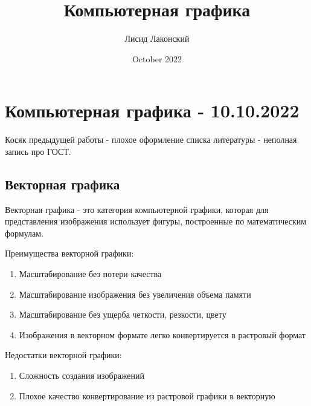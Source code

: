 \documentclass{article}
\title{Компьютерная графика}
\author{Лисид Лаконский}
\date{October 2022}
\begin{document}
\maketitle
\tableofcontents
\pagebreak

\section{Компьютерная графика - 10.10.2022}

Косяк предыдущей работы - плохое оформление списка литературы - неполная запись про ГОСТ.

\subsection{Векторная графика}

\begin{flushleft}

Векторная графика - это категория компьютерной графики, которая для представления изображения использует фигуры, построенные по математическим формулам.

Преимущества векторной графики:

\begin{enumerate}
    \item Масштабирование без потери качества
    \item Масштабирование изображения без увеличения объема памяти
    \item Масштабирование без ущерба четкости, резкости, цвету
    \item Изображения в векторном формате легко конвертируется в растровый формат
\end{enumerate}

Недостатки векторной графики:

\begin{enumerate}
    \item Сложность создания изображений
    \item Плохое качество конвертирование из растровой графики в векторную
\end{enumerate}

\end{flushleft}
\end{document}
